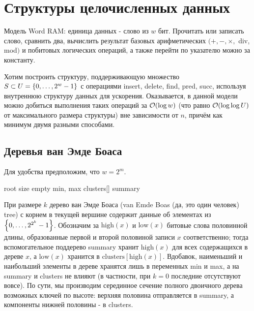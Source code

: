 \section{Структуры целочисленных данных}

\begin{definition}
Модель Word RAM: единица данных - слово из $w$ бит. Прочитать или записать слово, сравнить два, вычислить результат базовых арифметических $(+, -, \times,$ div, mod$)$ и побитовых логических операций, а также перейти по указателю можно за константу.
\end{definition}

Хотим построить структуру, поддерживающую множество $S\subset U = \set*{0, \ldots, 2^w - 1}$ с операциями insert, delete, find, pred, succ, используя внутреннюю структуру данных для ускорения. Оказывается, в данной модели можно добиться выполнения таких операций за $\BigO(\log w)$ (что равно $\BigO(\log\log U)$ от максимального размера структуры) вне зависимости от $n$, причём как минимум двумя разными способами.

\subsection{Деревья ван Эмде Боаса}

Для удобства предположим, что $w = 2^m$.
\begin{algorithmic}[0]
	\algrenewcommand{}
		\State root
	\EndProcedure
		\State size
		\State empty
		\State min, max
		\State clusters[]
		\State summary
	\EndProcedure
\end{algorithmic}

При размере $k$ дерево ван Эмде Боаса (van Emde Boas (да, это один человек) tree) с корнем в текущей вершине содержит данные об элементах из $\set*{0,\ldots,2^{2^k}-1}$. Обозначим за $\text{high}(x)$ и $\text{low}(x)$ битовые слова половинной длины, образованные первой и второй половиной записи $x$ соответственно; тогда вспомогательное поддерево summary хранит $\text{high}(x)$ для всех содержащихся в дереве $x$, а $\text{low}(x)$ хранится в $\text{clusters}[\text{high}(x)]$. Вдобавок, наименьший и наибольший элементы в дереве хранятся лишь в переменных min и max, а на summary и clusters не влияют (в частности, при $k = 0$ последние отсутствуют вовсе). По сути, мы производим серединное сечение полного двоичного дерева возможных ключей по высоте: верхняя половина отправляется в summary, а компоненты нижней половины - в clusters.

